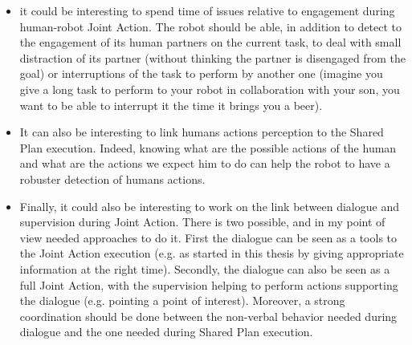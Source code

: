 \documentclass[english, a4paper,11pt,twoside]{StyleThese}
\begin{document}
\begin{itemize}
\item it could be interesting to spend time of issues relative to engagement during human-robot Joint Action. The robot should be able, in addition to detect to the engagement of its human partners on the current task, to deal with small distraction of its partner (without thinking the partner is disengaged from the goal) or interruptions of the task to perform by another one (imagine you give a long task to perform to your robot in collaboration with your son, you want to be able to interrupt it the time it brings you a beer).
\item It can also be interesting to link humans actions perception to the Shared Plan execution. Indeed, knowing what are the possible actions of the human and what are the actions we expect him to do can help the robot to have a robuster detection of humans actions.
\item Finally, it could also be interesting to work on the link between dialogue and supervision during Joint Action. There is two possible, and in my point of view needed approaches to do it. First the dialogue can be seen as a tools to the Joint Action execution (e.g. as started in this thesis by giving appropriate information at the right time). Secondly, the dialogue can also be seen as a full Joint Action, with the supervision helping to perform actions supporting the dialogue (e.g. pointing a point of interest). Moreover, a strong coordination should be done between the non-verbal behavior needed during dialogue and the one needed during Shared Plan execution.
\end{itemize}

\ifdefined{}
\else


\end{document}
